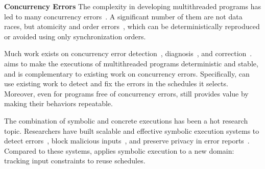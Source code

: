 \noindent
{\bf Concurrency Errors} The complexity in developing multithreaded
programs has led to many concurrency errors~\cite{lu:concurrency-bugs}.  A
significant number of them are not data races, but atomicity and order
errors~\cite{lu:concurrency-bugs}, which can be deterministically
reproduced or avoided using only synchronization orders.

Much work exists on concurrency error
detection~\cite{yu:racetrack:sosp,savage:eraser,racerx:sosp03,lu:muvi:sosp,
avio:asplos06,conmem:asplos10},
diagnosis~\cite{racefuzzer:pldi08,ctrigger:asplos09,atomfuzzer:fse08}, and
correction~\cite{dimmunix:osdi08,gadara:osdi08}.  \tern aims to make the
executions of multithreaded programs deterministic and stable, and is
complementary to existing work on concurrency errors.  Specifically,
\tern can use existing work to detect and fix the errors in the schedules
it selects.  Moreover, even for programs free of concurrency errors,
\tern still provides value by making their behaviors repeatable. 

 The combination of symbolic and
concrete executions has been a hot research topic.  Researchers have built
scalable and effective symbolic execution systems to detect
errors~\cite{dart:pldi,cute:fse,godefroid:grammar-fuzzing,
godefroid:whitebox-fuzzing,klee:osdi08,yang:malicious-disk:oakland06,
cadar:exe:ccs06,s2e:hotdep09,taas:socc10},
block malicious inputs~\cite{castro:bouncer}, and preserve privacy in
error reports~\cite{castro:bug-report-privacy}.  Compared to these
systems, \tern applies symbolic execution to a new domain: tracking input
constraints to reuse schedules.
